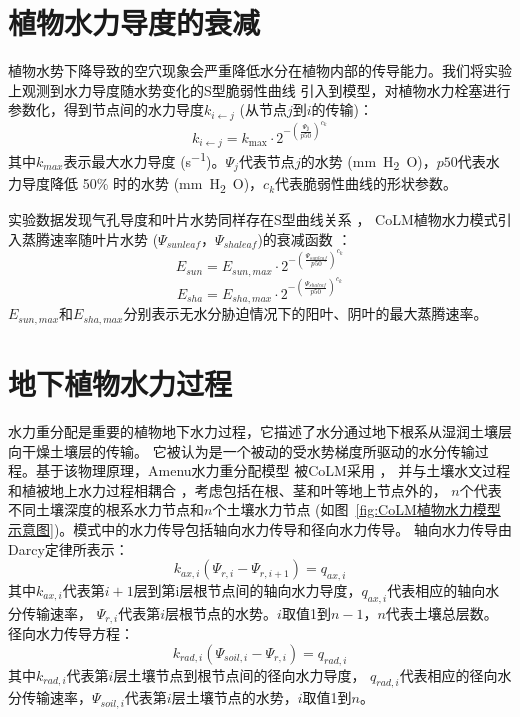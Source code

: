\section{植物水力导度的衰减}\label{植物水力导度的衰减}
植物水势下降导致的空穴现象会严重降低水分在植物内部的传导能力。我们将实验上观测到水力导度随水势变化的S型脆弱性曲线 
\citep{sperry1988method,gentine2016allometry,neufeld1992genotypic,pammenter1998mathematical,plaut2012hydraulic}
 引入到模型，对植物水力栓塞进行参数化，得到节点间的水力导度$k_{i\gets j}$ (从节点$j$到$i$的传输)：
\begin{equation}
k_{i \leftarrow j}=k_{\max } \cdot 2^{-\left(\frac{\Psi_{\mathbf{j}}}{p 50}\right)^{c_{k}}}
\end{equation}
其中$k_{max}$表示最大水力导度 (\unit{s^{-1}})。$\Psi_j$代表节点$j$的水势 (\unit{mm.H_2O})，$p50$代表水力导度降低 50\% 时的水势 (\unit{mm.H_2O})，$c_k$代表脆弱性曲线的形状参数。


实验数据发现气孔导度和叶片水势同样存在S型曲线关系 \citep{klein2014variability}，
CoLM植物水力模式引入蒸腾速率随叶片水势 ($\Psi_{sunleaf}$，$\Psi_{shaleaf}$)的衰减函数 \citep{kennedy2019implementing}：
\begin{equation}\label{e_sun_a}
E_{ {sun }}=E_{ {sun,max }} \cdot 2^{-\left(\frac{\Psi_{ {sunleaf }}}{p 50}\right)^{c_{k}}}
\end{equation}
\begin{equation}\label{e_sha_a}
E_{ {sha }}=E_{ {sha,max }} \cdot 2^{-\left(\frac{\Psi_{ {shaleaf }}}{p 50}\right)^{c_{k}}}
\end{equation}
$E_{sun,max} $和$E_{sha,max}$分别表示无水分胁迫情况下的阳叶、阴叶的最大蒸腾速率。

\section{地下植物水力过程}\label{地下植物水力过程}
水力重分配是重要的植物地下水力过程，它描述了水分通过地下根系从湿润土壤层向干燥土壤层的传输。
它被认为是一个被动的受水势梯度所驱动的水分传输过程。基于该物理原理，Amenu水力重分配模型 \citep{amenu2008}被CoLM采用 \citep{zhu2017incorporating}，
并与土壤水文过程和植被地上水力过程相耦合 \citep{li2021new}，考虑包括在根、茎和叶等地上节点外的， 
$n$个代表不同土壤深度的根系水力节点和$n$个土壤水力节点 (如图~\ref{fig:CoLM植物水力模型示意图})。模式中的水力传导包括轴向水力传导和径向水力传导。
轴向水力传导由Darcy定律所表示：
\begin{equation}\label{k_axi}
k_{ax,i}\left(\Psi_{r,i}-\Psi_{r,i+1}\right)=q_{ax,i}
\end{equation}
其中$k_{ax,i}$代表第$i+1$层到第i层根节点间的轴向水力导度，$q_{ax,i}$代表相应的轴向水分传输速率，
$\Psi_{r,i}$代表第$i$层根节点的水势。$i$取值1到$n-1$，$n$代表土壤总层数。\\
径向水力传导方程：
\begin{equation}\label{k_radi}
k_{rad,i}\left(\Psi_{soil,i}-\Psi_{r,i}\right)=q_{rad,i}
\end{equation}
其中$k_{rad,i}$代表第$i$层土壤节点到根节点间的径向水力导度，
$q_{rad,i}$代表相应的径向水分传输速率，$\Psi_{soil,i}$代表第$i$层土壤节点的水势，$i$取值1到$n$。



